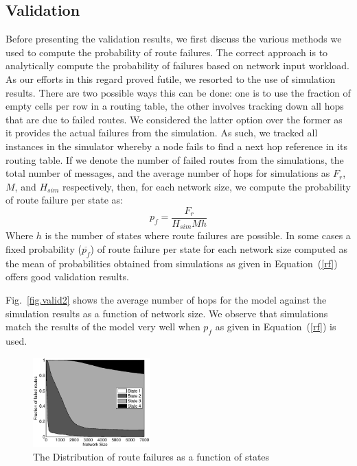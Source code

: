 \documentclass[10pt,twocolumn]{article}
\begin{document}
\subsection{Validation}
Before presenting the validation results, we first discuss the various methods
we used to compute the probability of route failures. The correct approach is
to analytically compute the probability of failures based on network input
workload. As our efforts in this regard proved futile, we resorted to the use
of simulation results. There are two possible ways this can be done: one is to
use the fraction of empty cells per row in a routing table, the other involves
tracking down all hops that are due to failed routes. We considered the latter
option over the former as it provides the actual failures from the simulation.
As such, we tracked all instances in the simulator whereby a node fails to find
a next hop reference in its routing table. If we denote the number of failed
routes from the simulations, the total number of messages, and the average
number of hops for simulations as $F_r$, $M$, and $H_{sim}$ respectively, then,
for each network size, we compute the probability of route failure per state
as:
\begin{equation}
\label{rf} p_f = \frac{F_r}{H_{sim}M h}
\end{equation}
Where $h$ is the number of states where route failures are possible. In some
cases a fixed probability ($\overline{p_f}$) of route failure per state for
each network size computed as the mean of probabilities obtained from
simulations as given in Equation~(\ref{rf}) offers good validation results.

Fig.~\ref{fig.valid2} shows the average number of hops for the model against
the simulation results  as a function of network size. We observe that
simulations match the results of the model very well when $p_f$ as given in
Equation~(\ref{rf}) is used.

\begin{figure}[tb] \centering
     {\includegraphics[width=0.4\textwidth]{prob01.eps}
     \caption{The Distribution of route failures as a function of states}
     \label{fig.fm}}
\end{figure}
\end{document}
